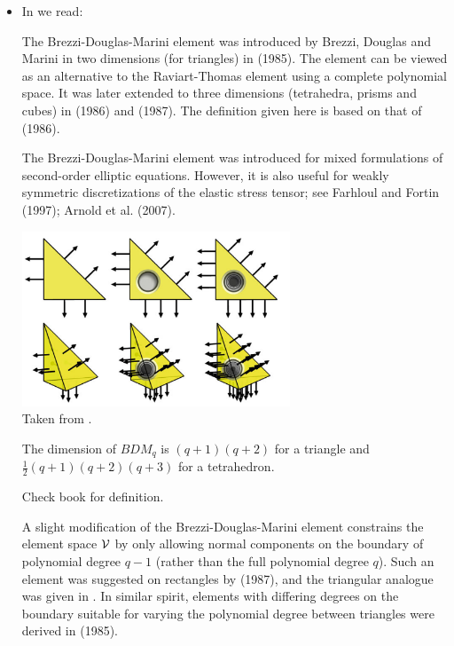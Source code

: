 \begin{itemize}
\item In \textcite{lomw12} we read:

The Brezzi-Douglas-Marini element was introduced by Brezzi, Douglas and Marini in two dimensions 
(for triangles) in \textcite{brdm85} (1985). The element can be viewed as an alternative to the
Raviart-Thomas element using a complete polynomial space. It was later extended to three 
dimensions (tetrahedra, prisms and cubes) in \textcite{nede86} (1986) 
and \textcite{brdd87} (1987). The definition given
here is based on that of \textcite{nede86} (1986).

The Brezzi-Douglas-Marini element was introduced for mixed formulations of second-order elliptic 
equations. However, it is also useful for weakly symmetric discretizations of the elastic stress
tensor; see Farhloul and Fortin (1997); Arnold et al. (2007).

\begin{center}
\includegraphics[width=8cm]{images/pair_bdm/bdm_lomw12}\\
{\captionfont Taken from \cite{lomw12}. }
\end{center}

The dimension of $BDM_q$ is $(q+1)(q+2)$ for a triangle and $\frac12(q+1)(q+2)(q+3)$
for a tetrahedron.

Check book for definition.

A slight modification of the Brezzi-Douglas-Marini element constrains the element space ${\cal V}$ by
only allowing normal components on the boundary of polynomial degree $q-1$ (rather than the full
polynomial degree $q$). Such an element was suggested on rectangles by \textcite{brdf87} (1987), and the
triangular analogue was given in \textcite{brfo}. In similar spirit, elements with differing
degrees on the boundary suitable for varying the polynomial degree between triangles were derived
in \textcite{brdm85b} (1985).


\end{itemize}

